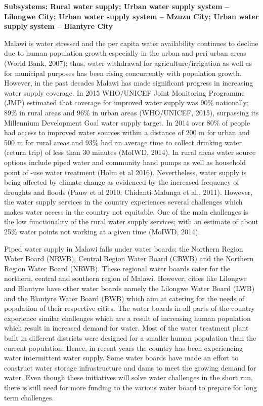 \documentclass[
]{book}
\begin{document}
\textbf{Subsystems: Rural water supply; Urban water supply system -- Lilongwe City; Urban water supply system -- Mzuzu City; Urban water supply system -- Blantyre City}

Malawi is water stressed and the per capita water availability continues to decline due to human population growth especially in the urban and peri urban areas (World Bank, 2007); thus, water withdrawal for agriculture/irrigation as well as for municipal purposes has been rising concurrently with population growth. However, in the past decades Malawi has made significant progress in increasing water supply coverage. In 2015 WHO/UNICEF Joint Monitoring Programme (JMP) estimated that coverage for improved water supply was 90\% nationally; 89\% in rural areas and 96\% in urban areas (WHO/UNICEF, 2015), surpassing its Millennium Development Goal water supply target. In 2014 over 80\% of people had access to improved water sources within a distance of 200 m for urban and 500 m for rural areas and 93\% had an average time to collect drinking water (return trip) of less than 30 minutes (MoIWD, 2014). In rural areas water source options include piped water and community hand pumps as well as household point of -use water treatment (Holm et al 2016). Nevertheless, water supply is being affected by climate change as evidenced by the increased frequency of droughts and floods (Pauw et al 2010; Chidanti-Malunga et al., 2011). However, the water supply services in the country experiences several challenges which makes water access in the country not equitable. One of the main challenges is the low functionality of the rural water supply services; with an estimate of about 25\% water points not working at a given time (MoIWD, 2014).

Piped water supply in Malawi falls under water boards; the Northern Region Water Board (NRWB), Central Region Water Board (CRWB) and the Northern Region Water Board (NRWB). These regional water boards cater for the northern, central and southern region of Malawi. However, cities like Lilongwe and Blantyre have other water boards namely the Lilongwe Water Board (LWB) and the Blantyre Water Board (BWB) which aim at catering for the needs of population of their respective cities. The water boards in all parts of the country experience similar challenges which are a result of increasing human population which result in increased demand for water. Most of the water treatment plant built in different districts were designed for a smaller human population than the current population. Hence, in recent years the country has been experiencing water intermittent water supply. Some water boards have made an effort to construct water storage infrastructure and dams to meet the growing demand for water. Even though these initiatives will solve water challenges in the short run, there is still need for more funding to the various water board to prepare for long term challenges.
\end{document}
